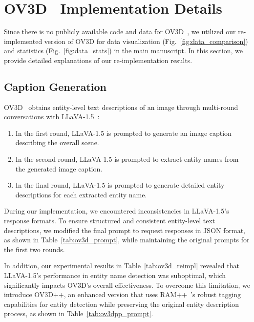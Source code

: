 \section{OV3D~\cite{jiang2024open} Implementation Details}

Since there is no publicly available code and data for OV3D~\cite{jiang2024open}, we utilized our re-implemented version of OV3D for data visualization (Fig.~\ref{fig:data_comparison}) and statistics (Fig.~\ref{fig:data_stats}) in the main manuscript.
In this section, we provide detailed explanations of our re-implementation results.

\subsection{Caption Generation}
OV3D~\cite{jiang2024open} obtains entity-level text descriptions of an image through multi-round conversations with LLaVA-1.5~\cite{liu2024improved}:

\begin{enumerate}
    \item In the first round, LLaVA-1.5 is prompted to generate an image caption describing the overall scene.
    \item In the second round, LLaVA-1.5 is prompted to extract entity names from the generated image caption.
    \item In the final round, LLaVA-1.5 is prompted to generate detailed entity descriptions for each extracted entity name.
\end{enumerate}
During our implementation, we encountered inconsistencies in LLaVA-1.5's response formats. 
To ensure structured and consistent entity-level text descriptions, we modified the final prompt to request responses in JSON format, as shown in Table~\ref{tab:ov3d_prompt}, while maintaining the original prompts for the first two rounds.



In addition, our experimental results in Table~\ref{tab:ov3d_reimpl} revealed that LLaVA-1.5's performance in entity name detection was suboptimal, which significantly impacts OV3D's overall effectiveness.
To overcome this limitation, we introduce OV3D++, an enhanced version that uses RAM++~\cite{ram_pp}'s robust tagging capabilities for entity detection while preserving the original entity description process, as shown in Table~\ref{tab:ov3dpp_prompt}.



